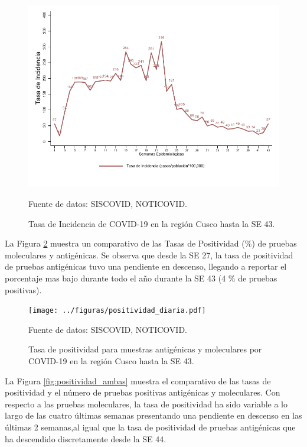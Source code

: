 \documentclass[12pt,a4paper,openany]{book}
\begin{document}
   \begin{figure}[h]
   	\caption{Tasa de Incidencia de COVID-19 en la región Cusco hasta la SE 43. }\label{fig:incidencia}
   	\begin{center}
   		\includegraphics[width=0.65\linewidth]{../figuras/tasa_incidencia}
   	\end{center}
   	{\footnotesize {Fuente de datos: SISCOVID, NOTICOVID.}}
   \end{figure}
   
   La Figura \ref{fig:total_muestras_procesada} muestra un comparativo de las Tasas de Positividad ($\%$) de pruebas moleculares y antigénicas. Se observa que desde la SE 27, la tasa de positividad de pruebas antigénicas tuvo una pendiente en descenso, llegando a reportar el porcentaje mas bajo durante todo el año durante la SE 43 (4 $\%$ de pruebas positivas). 
   
  
   
   \begin{figure}[h]
   	\caption{Tasa de positividad para muestras antigénicas y moleculares por COVID-19 en la región Cusco hasta la SE 43. }\label{fig:total_muestras_procesada}
   	\begin{center}
   		\texttt{[image: ../figuras/positividad\_diaria.pdf]}
   	\end{center}
   	{\footnotesize {Fuente de datos: SISCOVID, NOTICOVID.}}
   \end{figure}



La Figura \ref{fig:positividad_ambas} muestra el comparativo de las tasas de positividad y el número de pruebas positivas antigénicas y moleculares. Con respecto a las pruebas moleculares, la tasa de positividad ha sido variable a lo largo de las cuatro últimas semanas presentando una pendiente en descenso en las últimas 2 semanas,al igual que la tasa de positividad de pruebas antigénicas que ha descendido discretamente desde la SE 44.  
\end{document}
